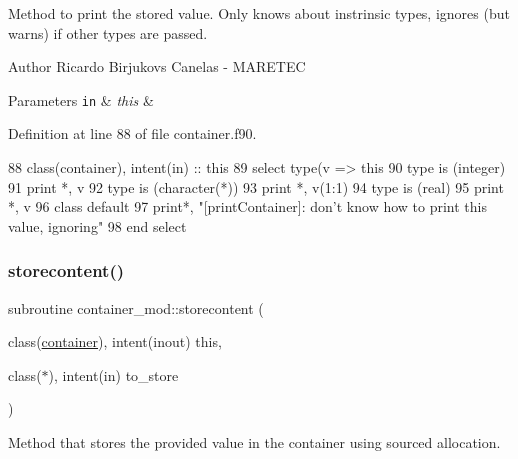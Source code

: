 Method to print the stored value. Only knows about instrinsic types, ignores (but warns) if other types are passed. 

\begin{DoxyAuthor}{Author}
Ricardo Birjukovs Canelas -\/ M\+A\+R\+E\+T\+EC 
\end{DoxyAuthor}

\begin{DoxyParams}[1]{Parameters}
\mbox{\tt in}  & {\em this} & \\
\hline
\end{DoxyParams}


Definition at line 88 of file container.\+f90.


\begin{DoxyCode}
88     \textcolor{keywordtype}{class}(container), \textcolor{keywordtype}{intent(in)} :: this
89     \textcolor{keywordflow}{select type}(v => this%
90 \textcolor{keywordflow}{    type is} (integer)
91         print *, v
92 \textcolor{keywordflow}{    type is} (\textcolor{keywordtype}{character}(*))
93         print *, v(1:1)
94 \textcolor{keywordflow}{    type is} (real)
95         print *, v
96 \textcolor{keywordflow}{        class default}
97         print*, \textcolor{stringliteral}{"[printContainer]: don't know how to print this value, ignoring"}
98 \textcolor{keywordflow}{    end select}
\end{DoxyCode}
\mbox{\label{namespacecontainer__mod_ace49cee012b6cd3c41c03556ab0dd884}} 
\subsubsection{\texorpdfstring{storecontent()}{storecontent()}}
{\footnotesize\ttfamily subroutine container\+\_\+mod\+::storecontent (\begin{DoxyParamCaption}\item[{class(\mbox{\hyperlink{structcontainer__mod_1_1container}{container}}), intent(inout)}]{this,  }\item[{class($\ast$), intent(in)}]{to\+\_\+store }\end{DoxyParamCaption})\hspace{0.3cm}{\ttfamily [private]}}



Method that stores the provided value in the container using sourced allocation. 

